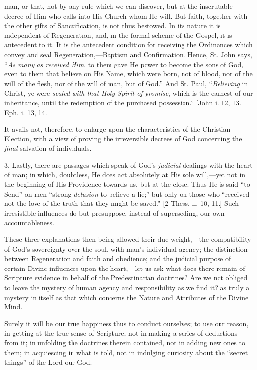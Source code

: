 man, or that, not by any rule which we can discover, but at the
inscrutable decree of Him who calls into His Church whom He will. But
faith, together with the other gifts of Sanctification, is not thus
bestowed. In its nature it is independent of Regeneration, and, in the
formal scheme of the Gospel, it is antecedent to it. It is the
antecedent condition for receiving the Ordinances which convey and seal
Regeneration,—Baptism and Confirmation. Hence, St. John says, ``\emph{As
many as received Him}, to them gave He power to become the sons of
God, even to them that believe on His Name, which were born, not of
blood, nor of the will of the flesh, nor of the will of man, but of
God.'' And St. Paul, ``\emph{Believing} in Christ, ye were \emph{sealed
with that Holy Spirit of promise}, which is the earnest of our
inheritance, until the redemption of the purchased possession.''
[John i. 12, 13. Eph. i. 13, 14.]

It avails not, therefore, to enlarge upon the characteristics of the
Christian Election, with a view of proving the irreversible decrees of
God concerning the \emph{final} salvation of individuals.

3. Lastly, there are passages which speak of God's \emph{judicial}
dealings with the heart of man; in which, doubtless, He does act
absolutely at His sole will,—yet not in the beginning of His Providence
towards us, but at the close. Thus He is said ``to Send'' on men
``strong \emph{delusion} to believe a lie;'' but only on those
who ``received not the love of the truth that they might be
saved.'' [2 Thess. ii. 10, 11.] Such irresistible influences do but
presuppose, instead of superseding, our own accountableness.

These three explanations then being allowed their due weight,—the
compatibility of God's sovereignty over the soul, with man's individual
agency; the distinction between Regeneration and faith and obedience;
and the judicial purpose of certain Divine influences upon the heart,—let us ask what does there remain of Scripture evidence in
behalf of the Predestinarian doctrines? Are we not obliged to leave the
mystery of human agency and responsibility as we find it? as truly a
mystery in itself as that which concerns the Nature and Attributes of
the Divine Mind.

Surely it will be our true happiness thus to conduct ourselves; to
use our reason, in getting at the true sense of Scripture, not in making
a series of deductions from it; in unfolding the doctrines therein
contained, not in adding new ones to them; in acquiescing in what is
told, not in indulging curiosity about the ``secret things'' of
the Lord our God.

